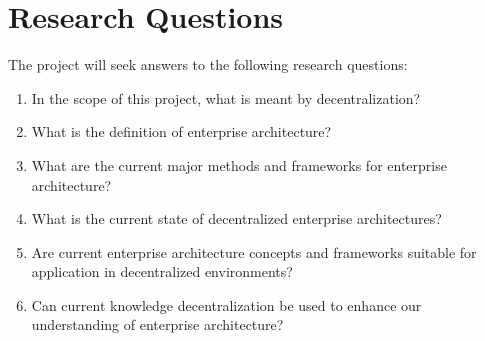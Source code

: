 \section{Research Questions}
The project will seek answers to the following research questions:
\begin{enumerate}
\item In the scope of this project, what is meant by decentralization?
\item What is the definition of enterprise architecture?
\item What are the current major methods and frameworks for enterprise architecture?
\item What is the current state of decentralized enterprise architectures?
\item Are current enterprise architecture concepts and frameworks suitable for application in decentralized environments?
\item Can current knowledge decentralization be used to enhance our understanding of enterprise architecture?
\end{enumerate}